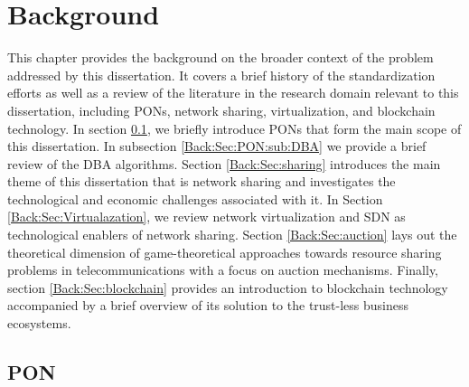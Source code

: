\chapter*{Background}

This chapter provides the background on the broader context of the problem addressed by this dissertation. It covers a brief history of the standardization efforts as well as a review of the literature in the research domain relevant to this dissertation, including \acp{PON}, network sharing, virtualization, and blockchain technology. In section \ref{Back:Sec:PON}, we briefly introduce \acp{PON} that form the main scope of this dissertation. In subsection \ref{Back:Sec:PON:sub:DBA} we provide a brief review of the \ac{DBA} algorithms. Section \ref{Back:Sec:sharing} introduces the main theme of this dissertation that is network sharing and investigates the technological and economic challenges associated with it. In Section \ref{Back:Sec:Virtualazation}, we review network virtualization and \ac{SDN} as technological enablers of network sharing. Section \ref{Back:Sec:auction} lays out the theoretical dimension of game-theoretical approaches towards resource sharing problems in telecommunications with a focus on auction mechanisms. Finally, section \ref{Back:Sec:blockchain} provides an introduction to blockchain technology accompanied by a brief overview of its solution to the trust-less business ecosystems.


\section{\acf{PON}}
\label{Back:Sec:PON}

